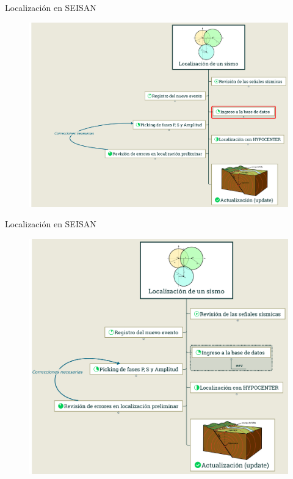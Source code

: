 \documentclass[11pt]{beamer}
\begin{document}
\begin{frame}{Localización en SEISAN}
\begin{figure}
\includegraphics[scale=0.15]{localizacion_1_3.png}
\end{figure}
\end{frame}

\begin{frame}{Localización en SEISAN}
\begin{figure}
\includegraphics[scale=0.15]{localizacion_4.png}
\end{figure}
\end{frame}
\end{document}
